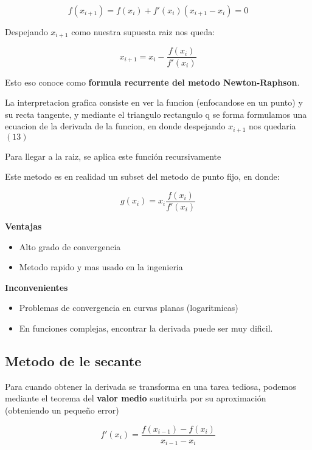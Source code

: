 \documentclass[10pt]{article}
\begin{document}
\begin{equation}
	f(x_{i+1}) = f(x_i) + f'(x_i)(x_{i+1} -x_i) = 0
\end{equation}

Despejando $x_{i+1}$ como nuestra supuesta raiz nos queda:

\begin{equation}
	x_{i+1} = x_i - \dfrac{f(x_i)}{f'(x_i)}
\end{equation}

Esto eso conoce como \textbf{formula recurrente del metodo Newton-Raphson}.

La interpretacion grafica consiste en ver la funcion (enfocandose en un punto) y su recta tangente, 
y mediante el triangulo rectangulo q se forma formulamos una ecuacion de la derivada de la funcion, 
en donde despejando $x_{i+1}$ nos quedaria $(13)$

Para llegar a la raiz, se aplica este función recursivamente

Este metodo es en realidad un subset del metodo de punto fijo, en donde:

\begin{equation}
	g(x_i) = x_i \dfrac{f(x_i)}{f'(x_i)}
\end{equation}

\textbf{Ventajas}
\begin{itemize}
	\item Alto grado de convergencia
	\item Metodo rapido y mas usado en la ingenieria
\end{itemize}

\textbf{Inconvenientes}
\begin{itemize}
	\item Problemas de convergencia en curvas planas (logaritmicas)
	\item En funciones complejas, encontrar la derivada puede ser muy dificil.
\end{itemize}

\subsection{Metodo de le secante}

Para cuando obtener la derivada se transforma en una tarea tediosa,
podemos mediante el teorema del \textbf{valor medio} sustituirla por
su aproximación (obteniendo un pequeño error)

\begin{equation}
	f'(x_i) = \dfrac{f(x_{i-1})-f(x_i)}{x_{i-1}-x_i}
\end{equation}
\end{document}
